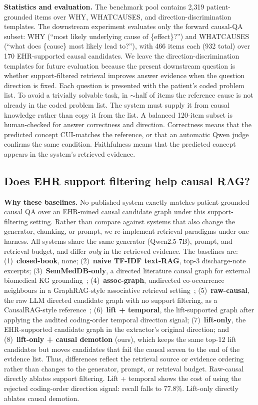 \documentclass[runningheads]{llncs}
\begin{document}
\smallskip\noindent\textbf{Statistics and evaluation.} The benchmark pool contains 2{,}319 patient-grounded items over WHY, WHATCAUSES, and direction-discrimination templates. The downstream experiment evaluates only the forward causal-QA subset: WHY (``most likely underlying cause of \{effect\}?'') and WHATCAUSES (``what does \{cause\} most likely lead to?''), with 466 items each (932 total) over 170 EHR-supported causal candidates. We leave the direction-discrimination templates for future evaluation because the present downstream question is whether support-filtered retrieval improves answer evidence when the question direction is fixed. Each question is presented with the patient's coded problem list. To avoid a trivially solvable task, in $\sim$half of items the reference cause is not already in the coded problem list. The system must supply it from causal knowledge rather than copy it from the list. A balanced 120-item subset is human-checked for answer correctness and direction. Correctness means that the predicted concept CUI-matches the reference, or that an automatic Qwen judge confirms the same condition. Faithfulness means that the predicted concept appears in the system's retrieved evidence.

\subsection{Does EHR support filtering help causal RAG?}
\noindent\textbf{Why these baselines.} No published system exactly matches patient-grounded causal QA over an EHR-mined causal candidate graph under this support-filtering setting. Rather than compare against systems that also change the generator, chunking, or prompt, we re-implement retrieval paradigms under one harness. All systems share the same generator (Qwen2.5-7B), prompt, and retrieval budget, and differ \emph{only} in the retrieved evidence. The baselines are: (1)~\textbf{closed-book}, none; (2)~\textbf{naive TF-IDF text-RAG}, top-3 discharge-note excerpts; (3)~\textbf{SemMedDB-only}, a directed literature causal graph for external biomedical KG grounding~\cite{kilicoglu2012semmeddb}; (4)~\textbf{assoc-graph}, undirected co-occurrence neighbours in a GraphRAG-style associative retrieval setting~\cite{edge2024graphrag,medgraphrag2024,jiang2024graphcare}; (5)~\textbf{raw-causal}, the raw LLM directed candidate graph with no support filtering, as a CausalRAG-style reference~\cite{wang2025causalrag}; (6)~\textbf{lift + temporal}, the lift-supported graph after applying the audited coding-order temporal direction signal; (7)~\textbf{lift-only}, the EHR-supported candidate graph in the extractor's original direction; and (8)~\textbf{lift-only + causal demotion} (ours), which keeps the same top-12 lift candidates but moves candidates that fail the causal screen to the end of the evidence list. Thus, differences reflect the retrieval source or evidence ordering rather than changes to the generator, prompt, or retrieval budget. %
Raw-causal directly ablates support filtering. Lift + temporal shows the cost of using the rejected coding-order direction signal: recall falls to 77.8\%. Lift-only directly ablates causal demotion.
\end{document}
